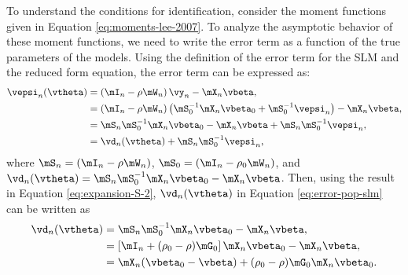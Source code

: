 To understand the conditions for identification, consider the moment functions given in Equation \eqref{eq:moments-lee-2007}. To analyze the asymptotic behavior of these moment functions, we need to write the error term as a function of the true parameters of the models. Using the definition of the error term for the SLM and the reduced form equation, the error term can be expressed as:
\begin{equation}\label{eq:error-pop-slm}
  \begin{aligned}
    \vepsi_n(\vtheta) & = \left(\mI_n - \rho \mW_n\right)\vy_n - \mX_n\vbeta, \\
                      & = \left(\mI_n - \rho \mW_n\right)\left(\mS_0^{-1}\mX_n\vbeta_0 + \mS_0^{-1}\vepsi_n\right) - \mX_n\vbeta, \\
                      & = \mS_n\mS_0^{-1}\mX_n\vbeta_0 - \mX_n\vbeta + \mS_n\mS_0^{-1}\vepsi_n, \\
                      & = \vd_n(\vtheta) + \mS_n\mS_0^{-1}\vepsi_n,
  \end{aligned}
\end{equation}
%
where $\mS_n = \left(\mI_n - \rho \mW_n\right)$, $\mS_0 = \left(\mI_n - \rho_0 \mW_n\right)$, and $\vd_n(\vtheta) = \mS_n\mS_0^{-1}\mX_n\vbeta_0 - \mX_n\vbeta$. Then, using the result in Equation \eqref{eq:expansion-S-2}, $\vd_n(\vtheta)$ in Equation \eqref{eq:error-pop-slm} can be written as
\begin{equation*}
\begin{aligned}
\vd_n(\vtheta) & = \mS_n\mS_0^{-1}\mX_n\vbeta_0 - \mX_n\vbeta,  \\
               & = \left[\mI_n + (\rho_0 - \rho)\mG_0\right]\mX_n\vbeta_0 - \mX_n\vbeta, \\
               & = \mX_n(\vbeta_0 - \vbeta) + (\rho_0 - \rho)\mG_0\mX_n\vbeta_0.
\end{aligned}
\end{equation*}

